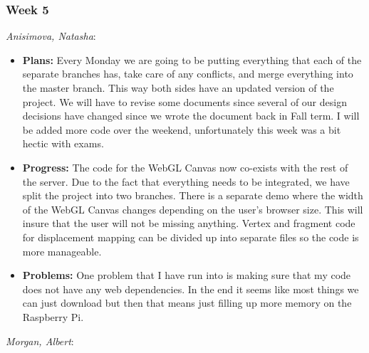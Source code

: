 \documentclass[10pt,draftclsnofoot,onecolumn]{IEEEtran}
\newcommand{\subsubsubsection}[1]{
	\hfill\break\textit{#1}:
}
\begin{document}
\subsubsection{Week 5}
\subsubsubsection{Anisimova, Natasha}
\begin{itemize}
	\item \textbf{Plans: }
	Every Monday we are going to be putting everything that each of the separate branches has, take care of any conflicts, and merge everything into the master branch. This way both sides have an updated version of the project. We will have to revise some documents since several of our design decisions have changed since we wrote the document back in Fall term. I will be added more code over the weekend, unfortunately this week was a bit hectic with exams.
	\item \textbf{Progress: }
	The code for the WebGL Canvas now co-exists with the rest of the server. Due to the fact that everything needs to be integrated, we have split the project into two branches. There is a separate demo where the width of the WebGL Canvas changes depending on the user's browser size. This will insure that the user will not be missing anything. Vertex and fragment code for displacement mapping can be divided up into separate files so the code is more manageable.
	\item \textbf{Problems: }
	One problem that I have run into is making sure that my code does not have any web dependencies. In the end it seems like most things we can just download but then that means just filling up more memory on the Raspberry Pi.
\end{itemize}
\subsubsubsection{Morgan, Albert}
\end{document}
